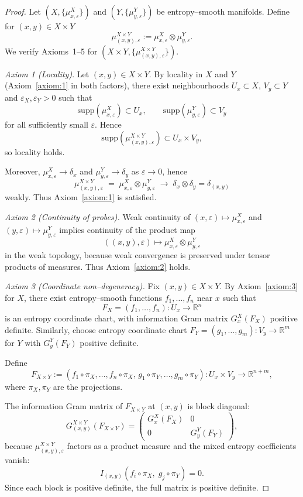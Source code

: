 \documentclass[10pt,a4paper]{amsart}
\begin{document}
\begin{proof}
Let $(X,\{\mu^{X}_{x,\varepsilon}\})$ and $(Y,\{\mu^{Y}_{y,\varepsilon}\})$ be entropy–smooth manifolds.
Define for $(x,y)\in X\times Y$
\[
\mu^{X\times Y}_{(x,y),\varepsilon}
:= \mu^{X}_{x,\varepsilon}\otimes \mu^{Y}_{y,\varepsilon}.
\]
We verify Axioms~1–5 for $(X\times Y,\{\mu^{X\times Y}_{(x,y),\varepsilon}\})$.


\emph{Axiom 1 (Locality)}.
Let $(x,y)\in X\times Y$. By locality in $X$ and $Y$ (Axiom~\ref{axiom:1} in both factors),
there exist neighbourhoods $U_x\subset X$, $V_y\subset Y$ and $\varepsilon_X,\varepsilon_Y>0$
such that
\[
\mathrm{supp}(\mu^{X}_{x,\varepsilon})\subset U_x,\qquad
\mathrm{supp}(\mu^{Y}_{y,\varepsilon})\subset V_y
\]
for all sufficiently small $\varepsilon$. Hence
\[
\mathrm{supp}(\mu^{X\times Y}_{(x,y),\varepsilon})
\subset U_x\times V_y,
\]
so locality holds.

Moreover, $\mu^{X}_{x,\varepsilon}\to\delta_x$ and $\mu^{Y}_{y,\varepsilon}\to\delta_y$
as $\varepsilon\to0$, hence
\[
\mu^{X\times Y}_{(x,y),\varepsilon}
\;=\;\mu^{X}_{x,\varepsilon}\otimes\mu^{Y}_{y,\varepsilon}
\;\longrightarrow\;
\delta_x\otimes\delta_y=\delta_{(x,y)}
\]
weakly. Thus Axiom~\ref{axiom:1} is satisfied.

\medskip

\emph{Axiom 2 (Continuity of probes).}
Weak continuity of
$(x,\varepsilon)\mapsto\mu^{X}_{x,\varepsilon}$ and $(y,\varepsilon)\mapsto\mu^{Y}_{y,\varepsilon}$
implies continuity of the product map
\[
((x,y),\varepsilon) \longmapsto 
\mu^{X}_{x,\varepsilon}\otimes\mu^{Y}_{y,\varepsilon}
\]
in the weak topology, because weak convergence is preserved under tensor products of measures.
Thus Axiom~\ref{axiom:2} holds.

\medskip

\emph{Axiom 3 (Coordinate non–degeneracy).}
Fix $(x,y)\in X\times Y$. By Axiom~\ref{axiom:3} for $X$, there exist entropy–smooth functions
$f_1,\dots,f_n$ near $x$ such that
\[
F_X=(f_1,\dots,f_n):U_x\to\mathbb{R}^n
\]
is an entropy coordinate chart, with information Gram matrix
$G^X_{x}(F_X)$ positive definite.
Similarly, choose entropy coordinate chart
$F_Y=(g_1,\dots,g_m):V_y\to\mathbb{R}^m$ for $Y$ with
$G^{Y}_y(F_Y)$ positive definite.

Define
\[
F_{X\times Y} := (f_1\circ\pi_X,\dots,f_n\circ\pi_X,\,
                 g_1\circ\pi_Y,\dots,g_m\circ\pi_Y)
: U_x\times V_y \longrightarrow \mathbb{R}^{n+m},
\]
where $\pi_X,\pi_Y$ are the projections.

The information Gram matrix of $F_{X\times Y}$ at $(x,y)$ is block diagonal:
\[
G^{X\times Y}_{(x,y)}(F_{X\times Y})
=
\begin{pmatrix}
G^X_x(F_X) & 0 \\
0 & G^Y_y(F_Y)
\end{pmatrix},
\]
because $\mu^{X\times Y}_{(x,y),\varepsilon}$
factors as a product measure and the mixed entropy coefficients vanish:
\[
I_{(x,y)}(f_i\circ\pi_X,\; g_j\circ\pi_Y)=0.
\]
Since each block is positive definite, the full matrix is positive definite.


\end{proof}
\end{document}
